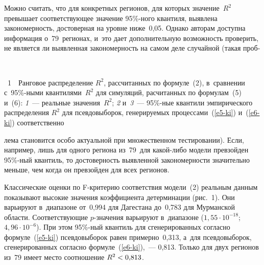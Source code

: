 \begin{multicols}{2}
{}

  Можно считать, что для конкретных регионов, для которых значение~$R^2$ 
превышает соответствующее значение 95\%-ного квантиля, выявлена закономерность, 
достоверная на уровне ниже~0,05. Однако авторам доступна информация 
о~79~регионах, и~это дает дополнительную возможность проверить, не является ли 
выявленная закономерность на самом деле случайной (такая проб-\linebreak\vspace*{-12pt}


{ \begin{center}  %
 \vspace*{-1pt}
    \mbox{%
 \epsfxsize=79mm %
 }

\end{center}

\noindent
{{\figurename~1}\ \ \small{Ранговое распределение $R^2$, рассчитанных по формуле~(2), 
в~сравнении с~95\%-ными квантилями~$R^2$ для симуляций, расчитанных по 
формулам~(5) и~(6): \textit{1}~--- реальные значения~$R^2$; 
\textit{2} и~\textit{3}~--- 95\%-ные квантили эмпирического распределения $R^2$ для 
псевдовыборок, генерируемых процессами~(\ref{e5-ki}) и~(\ref{e6-ki})
соответственно
}}}

\vspace*{12pt}


\noindent
ле\-ма становится особо 
актуальной при множественном тестировании). Если, например, лишь для одного 
региона из~79~для какой-либо модели превзойден 95\%-ный квантиль, то достоверность 
выявленной закономерности значительно меньше, чем когда он превзойден для всех 
регионов. 
{

}


 Классические оценки по F-критерию соответствия модели~(2) реальным данным 
показывают высокие значения коэффициента детерминации (рис.~1). Они варьируют 
в~диапазоне от~0,994 для Дагестана до~0,783 для Мурманской области. 
Соответствующие $p$-значения варьируют в~диапазоне ($1{,}55\cdot 10^{-18}$; 
$4{,}96\cdot 10^{-6}$). При этом  
95\%-ный квантиль для сгенерированных согласно формуле~(\ref{e5-ki}) псевдовыборок равен 
примерно~0,313, а~для псевдовыборок, сгенерированных 
согласно формуле~(\ref{e6-ki}),~---
0,813. Только для двух регионов из~79 имеет место соотношение $R^2\hm< 
0{,}813$.


\end{multicols}
